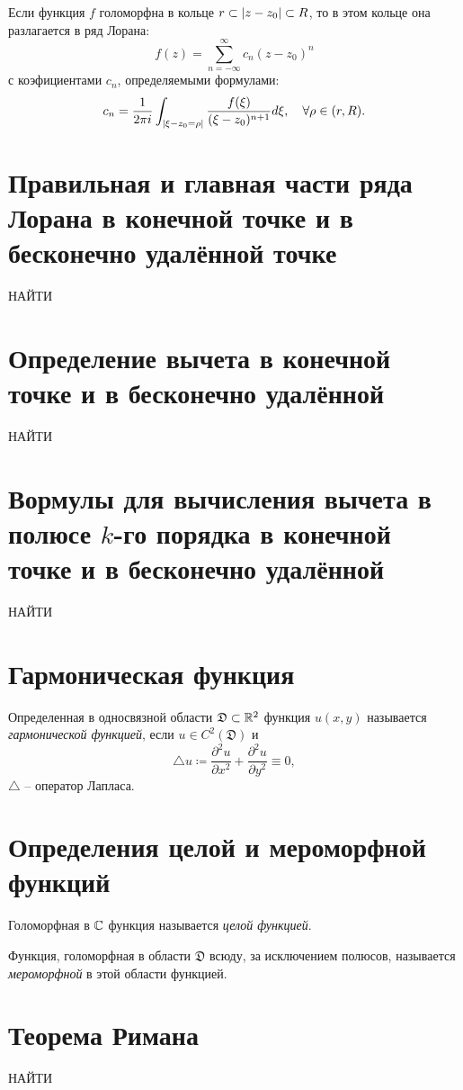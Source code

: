 \begin{theorem}
  Если функция $f$ голоморфна в кольце $r \subset \left\lvert z-z_0\right\rvert\subset R$, то в этом кольце она разлагается в ряд Лорана:
  \[
    f(z) = \sum_{n=-\infty}^{\infty}c_n(z-z_0)^n
  \]
  с коэфициентами $c_n$, определяемыми формулами:
  \[
    c_n = \frac{1}{2\pi i}\int_{\left\lvert \xi - z_0 = \rho\right\rvert}\frac{f(\xi)}{(\xi-z_0)^{n+1}}d \xi, \quad \forall \rho \in (r,R).
  \]
\end{theorem}

\section{Правильная и главная части ряда Лорана в конечной точке и в бесконечно удалённой точке}

 {\huge НАЙТИ}

\section{Определение вычета в конечной точке и в бесконечно удалённой}

 {\huge НАЙТИ}

\section{Вормулы для вычисления вычета в полюсе $k$-го порядка в конечной точке и в бесконечно удалённой}

 {\huge НАЙТИ}

\section{Гармоническая функция}

\begin{definition}
  Определенная в односвязной области $\mathfrak{D}\subset \mathbb{R}^2$ функция $u(x,y)$ называется \emph{гармонической функцией}, если $u \in C^2(\mathfrak{D})$ и
  \[
    \triangle u \coloneq \frac{\partial^2 u}{\partial x^2} + \frac{\partial^2 u}{\partial y^2} \equiv 0,
  \]
  $\triangle$ -- оператор Лапласа.
\end{definition}

\section{Определения целой и мероморфной функций}

\begin{definition}
  Голоморфная в $\mathbb{C}$ функция называется \emph{целой функцией}.
\end{definition}

\begin{definition}
  Функция, голоморфная в области $\mathfrak{D}$ всюду, за исключением полюсов, называется \emph{мероморфной} в этой области функцией.
\end{definition}

\section{Теорема Римана}

 {\huge НАЙТИ}
